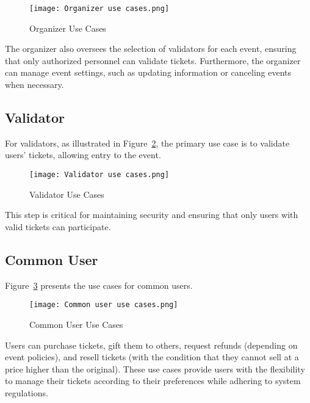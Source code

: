 \begin{figure}[H]
    \centering
    \texttt{[image: Organizer use cases.png]}
    \caption{Organizer Use Cases}
    \label{fig:organizer_use_cases}
\end{figure}

The organizer also oversees the selection of validators for each event,
ensuring that only authorized personnel can validate tickets. Furthermore, the
organizer can manage event settings, such as updating information or canceling
events when necessary.

\subsection{Validator}
\label{subsec:validator}

For validators, as illustrated in Figure~\ref{fig:validator_use_cases}, the
primary use case is to validate users' tickets, allowing entry to the event.

\begin{figure}[H]
    \centering
    \texttt{[image: Validator use cases.png]}
    \caption{Validator Use Cases}
    \label{fig:validator_use_cases}
\end{figure}

This step is critical for maintaining security and ensuring that only users
with valid tickets can participate.

\subsection{Common User}
\label{subsec:common_user}

Figure~\ref{fig:common_user_use_cases} presents the use cases for common users.

\begin{figure}[H]
    \centering
    \texttt{[image: Common user use cases.png]}
    \caption{Common User Use Cases}
    \label{fig:common_user_use_cases}
\end{figure}

Users can purchase tickets, gift them to others, request refunds (depending on
event policies), and resell tickets (with the condition that they cannot sell
at a price higher than the original). These use cases provide users with the
flexibility to manage their tickets according to their preferences while
adhering to system regulations.
